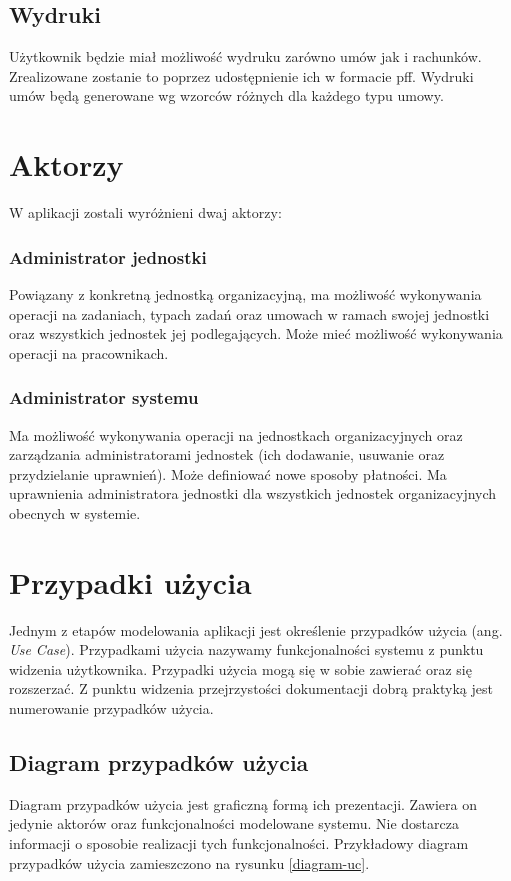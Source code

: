 \subsection[Wydruki][Wydruki]{Wydruki}
Użytkownik będzie miał możliwość wydruku zarówno umów jak i rachunków. Zrealizowane zostanie to poprzez udostępnienie ich w formacie pff. Wydruki umów będą generowane wg wzorców różnych dla każdego typu umowy.

\section[Aktorzy][Aktorzy]{Aktorzy}
W aplikacji zostali wyróżnieni dwaj aktorzy:

\subsubsection{Administrator jednostki}
Powiązany z konkretną jednostką organizacyjną, ma możliwość wykonywania operacji na zadaniach, typach zadań oraz umowach w ramach swojej jednostki oraz wszystkich jednostek jej podlegających. Może mieć możliwość wykonywania operacji na pracownikach.

\subsubsection{Administrator systemu}
Ma możliwość wykonywania operacji na jednostkach organizacyjnych oraz zarządzania administratorami jednostek (ich dodawanie, usuwanie oraz przydzielanie uprawnień). Może definiować nowe sposoby płatności. Ma uprawnienia administratora jednostki dla wszystkich jednostek organizacyjnych obecnych w systemie.

\section[Przypadki użycia][Przypadki użycia]{Przypadki użycia}
Jednym z etapów modelowania aplikacji jest określenie przypadków użycia (ang. \textit{Use Case}). Przypadkami użycia nazywamy funkcjonalności systemu z punktu widzenia użytkownika. Przypadki użycia mogą się w sobie zawierać oraz się rozszerzać. Z punktu widzenia przejrzystości dokumentacji dobrą praktyką jest numerowanie przypadków użycia.

\subsection[Diagram przypadków użycia][Diagram przypadków użycia]{Diagram przypadków użycia}
Diagram przypadków użycia jest graficzną formą ich prezentacji. Zawiera on jedynie aktorów oraz funkcjonalności modelowane systemu. Nie dostarcza informacji o sposobie realizacji tych funkcjonalności. Przykładowy diagram przypadków użycia zamieszczono na rysunku \ref{diagram-uc}.


